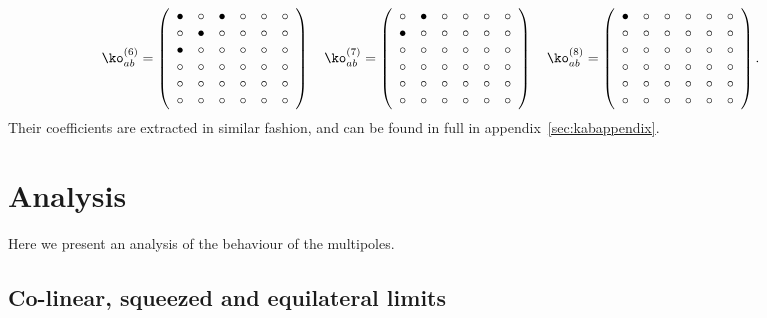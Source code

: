 \begin{align}
\\ \ko^{(6)}_{ab}&= 
 \left( \begin {array}{cccccc} \bullet &\circ &\bullet &\circ 
&\circ &\circ \\  \circ &\bullet &\circ &
\circ &\circ &\circ \\  \bullet &\circ &
\circ &\circ &\circ &\circ \\  \circ &
\circ &\circ &\circ &\circ &\circ \\  
\circ &\circ &\circ &\circ &\circ &\circ 
\\  \circ &\circ &\circ &\circ &\circ &
\circ \end {array} \right) 
~~~ \ko^{(7)}_{ab}= 
 \left( \begin {array}{cccccc} \circ &\bullet &\circ &\circ &
\circ &\circ \\  \bullet &\circ &\circ &
\circ &\circ &\circ \\  \circ &\circ &
\circ &\circ &\circ &\circ \\  \circ &
\circ &\circ &\circ &\circ &\circ \\  
\circ &\circ &\circ &\circ &\circ &\circ 
\\  \circ &\circ &\circ &\circ &\circ &
\circ \end {array} \right) 
~~~ \ko^{(8)}_{ab}= 
 \left( \begin {array}{cccccc} \bullet &\circ &\circ &\circ &
\circ &\circ \\  \circ &\circ &\circ &
\circ &\circ &\circ \\  \circ &\circ &
\circ &\circ &\circ &\circ \\  \circ &
\circ &\circ &\circ &\circ &\circ \\  
\circ &\circ &\circ &\circ &\circ &\circ 
\\  \circ &\circ &\circ &\circ &\circ &
\circ \end {array} \right).
\end{align}
Their coefficients are extracted in similar fashion, and can be found in full in appendix~\ref{sec:kabappendix}. 


\section{Analysis}\label{sec:anal}

Here we present an analysis of the behaviour of the  multipoles. 


\subsection{ Co-linear, squeezed and equilateral limits}

